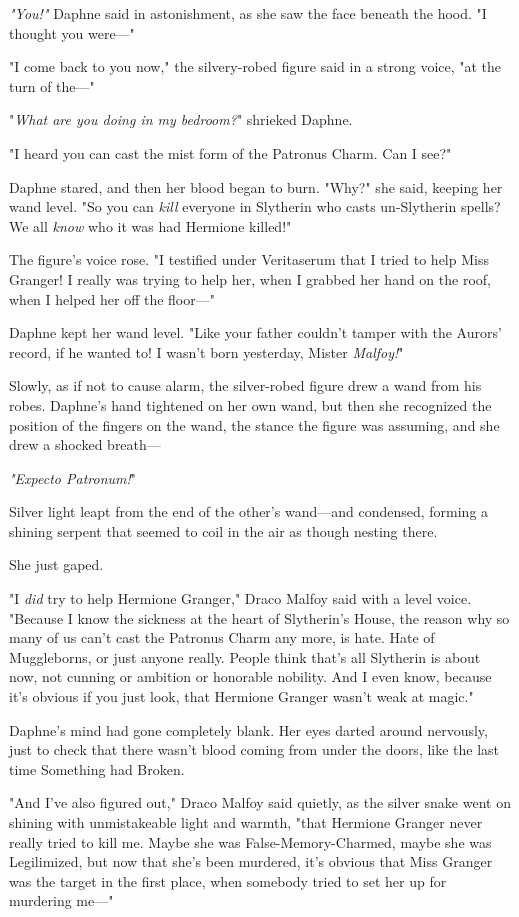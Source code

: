 \emph{"You!"} Daphne said in astonishment, as she saw the face beneath the hood. "I thought you were---"

"I come back to you now," the silvery-robed figure said in a strong voice, "at the turn of the---"

"\emph{What are you doing in my bedroom?}" shrieked Daphne.

"I heard you can cast the mist form of the Patronus Charm. Can I see?"

Daphne stared, and then her blood began to burn. "Why?" she said, keeping her wand level. "So you can \emph{kill} everyone in Slytherin who casts un-Slytherin spells? We all \emph{know} who it was had Hermione killed!"

The figure's voice rose. "I testified under Veritaserum that I tried to help Miss Granger! I really was trying to help her, when I grabbed her hand on the roof, when I helped her off the floor---"

Daphne kept her wand level. "Like your father couldn't tamper with the Aurors' record, if he wanted to! I wasn't born yesterday, Mister \emph{Malfoy!}"

Slowly, as if not to cause alarm, the silver-robed figure drew a wand from his robes. Daphne's hand tightened on her own wand, but then she recognized the position of the fingers on the wand, the stance the figure was assuming, and she drew a shocked breath---

\emph{"Expecto Patronum!}"

Silver light leapt from the end of the other's wand---and condensed, forming a shining serpent that seemed to coil in the air as though nesting there.

She just gaped.

"I \emph{did} try to help Hermione Granger," Draco Malfoy said with a level voice. "Because I know the sickness at the heart of Slytherin's House, the reason why so many of us can't cast the Patronus Charm any more, is hate. Hate of Muggleborns, or just anyone really. People think that's all Slytherin is about now, not cunning or ambition or honorable nobility. And I even know, because it's obvious if you just look, that Hermione Granger wasn't weak at magic."

Daphne's mind had gone completely blank. Her eyes darted around nervously, just to check that there wasn't blood coming from under the doors, like the last time Something had Broken.

"And I've also figured out," Draco Malfoy said quietly, as the silver snake went on shining with unmistakeable light and warmth, "that Hermione Granger never really tried to kill me. Maybe she was False-Memory-Charmed, maybe she was Legilimized, but now that she's been murdered, it's obvious that Miss Granger was the target in the first place, when somebody tried to set her up for murdering me---"

